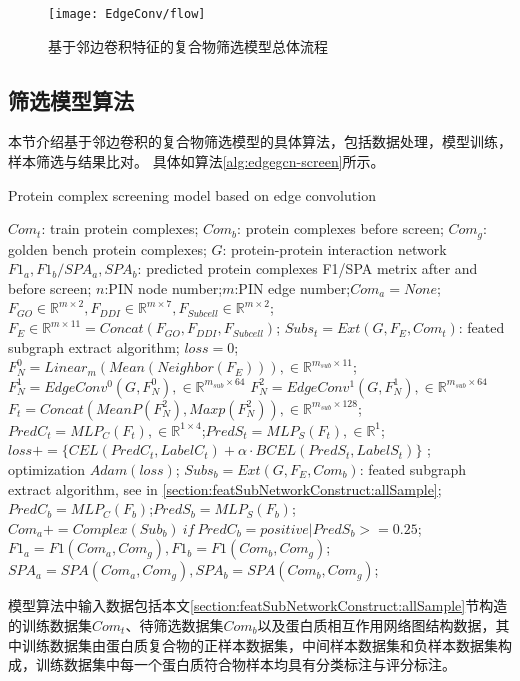 \begin{figure}[htbp]
    \centering
    \texttt{[image: EdgeConv/flow]}
    \caption{基于邻边卷积特征的复合物筛选模型总体流程}
    \label{fig:EdgeConv/flow}
\end{figure}

\subsection{筛选模型算法}
本节介绍基于邻边卷积的复合物筛选模型的具体算法，包括数据处理，模型训练，样本筛选与结果比对。
具体如算法\ref{alg:edgegcn-screen}所示。

\begin{algorithm}[h]
    \caption{Protein complex screening model based on edge convolution} %
    \label{alg:edgegcn-screen}
    \begin{algorithmic}[1]
        \Require
        $Com_t$: train protein complexes;
        $Com_b$: protein complexes before screen;
        $Com_g$: golden bench protein complexes;
        $G$: protein-protein interaction network
        \Ensure
        $F1_a,F1_b/SPA_a,SPA_b$: predicted protein complexes F1/SPA metrix after and before screen;
        \State $n$:PIN node number;$m$:PIN edge number;$Com_a=None$;
        \State $F_{GO}\in \mathbb{R}^{m\times 2},F_{DDI}\in \mathbb{R}^{m\times 7},F_{Subcell}\in \mathbb{R}^{m\times 2}$;
        \State $F_{E} \in \mathbb{R}^{m\times 11}=Concat(F_{GO},F_{DDI},F_{Subcell})$;
        \State $Subs_t=Ext(G,F_{E},Com_t)$: feated subgraph extract algorithm;
         $loss=0$;
        \State $F_{N}^0 =Linear_m(Mean(Neighbor(F_{E}))), \in \mathbb{R}^{m_{sub}\times 11}$;
        \State $F_{N}^1=EdgeConv^0(G,F_{N}^0), \in \mathbb{R}^{m_{sub}\times 64}$
        \State $F_{N}^2=EdgeConv^1(G,F_{N}^1), \in \mathbb{R}^{m_{sub}\times 64}$
        \State $F_t=Concat(MeanP(F_{N}^2),Maxp(F_{N}^2)), \in \mathbb{R}^{m_{sub}\times 128}$;
        \State $PredC_t=MLP_C(F_t),\in \mathbb{R}^{1\times 4}$;$PredS_t=MLP_S(F_t),\in \mathbb{R}^{1}$;
        \State $loss+=\{CEL(PredC_t,LabelC_t)+\alpha \cdot BCEL(PredS_t,LabelS_t)\}$
        \EndFor; optimization $Adam(loss)$;
        \EndFor
        \EndFor
        \State $Subs_b=Ext(G,F_{E},Com_b)$: feated subgraph extract algorithm, see in \ref{section:featSubNetworkConstruct:allSample};
         $PredC_b=MLP_C(F_b)$;$PredS_b=MLP_S(F_b)$;
        \State $Com_a+=Complex(Sub_b)~if~PredC_b=positive|PredS_b>=0.25$;
        \EndFor
        \State $F1_a=F1(Com_a,Com_g),F1_b=F1(Com_b,Com_g)$;
        \State $SPA_a=SPA(Com_a,Com_g),SPA_b=SPA(Com_b,Com_g)$;
    \end{algorithmic}
\end{algorithm}
模型算法中输入数据包括本文\ref{section:featSubNetworkConstruct:allSample}节构造的训练数据集$Com_t$、待筛选数据集$Com_b$以及蛋白质相互作用网络图结构数据，其中训练数据集由蛋白质复合物的正样本数据集，中间样本数据集和负样本数据集构成，训练数据集中每一个蛋白质符合物样本均具有分类标注与评分标注。

